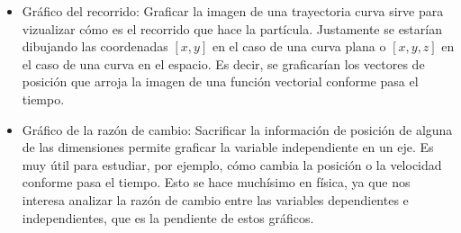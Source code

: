\begin{itemize}
    \item
    Gráfico del recorrido: Graficar la imagen de una trayectoria curva sirve para vizualizar cómo es el recorrido que hace la partícula.
    Justamente se estarían dibujando las coordenadas $[x,y]$ en el caso de una curva plana o $[x,y,z]$ en el caso de una curva en el espacio.
    Es decir, se graficarían los vectores de posición que arroja la imagen de una función vectorial conforme pasa el tiempo.
    
    \item
    Gráfico de la razón de cambio: Sacrificar la información de posición de alguna de las dimensiones permite graficar la variable independiente en un eje.
    Es muy útil para estudiar, por ejemplo, cómo cambia la posición o la velocidad conforme pasa el tiempo.
    Esto se hace muchísimo en física, ya que nos interesa analizar la razón de cambio entre las variables dependientes e independientes, que es la pendiente de estos gráficos.
\end{itemize}

